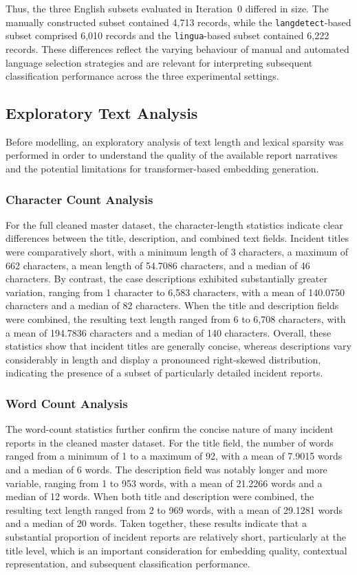 \documentclass[11pt, titlepage, bibliography=totoc]{scrreprt}
\begin{document}
Thus, the three English subsets evaluated in Iteration~0 differed in size. The manually constructed subset contained 4,713 records, while the \texttt{langdetect}-based subset comprised 6,010 records and the \texttt{lingua}-based subset contained 6,222 records. These differences reflect the varying behaviour of manual and automated language selection strategies and are relevant for interpreting subsequent classification performance across the three experimental settings.

\subsection{Exploratory Text Analysis}

Before modelling, an exploratory analysis of text length and lexical sparsity was performed in order to understand the quality of the available report narratives and the potential limitations for transformer-based embedding generation.

\subsubsection{Character Count Analysis}

For the full cleaned master dataset, the character-length statistics indicate clear differences between the title, description, and combined text fields. Incident titles were comparatively short, with a minimum length of 3 characters, a maximum of 662 characters, a mean length of 54.7086 characters, and a median of 46 characters. By contrast, the case descriptions exhibited substantially greater variation, ranging from 1 character to 6,583 characters, with a mean of 140.0750 characters and a median of 82 characters. When the title and description fields were combined, the resulting text length ranged from 6 to 6,708 characters, with a mean of 194.7836 characters and a median of 140 characters. Overall, these statistics show that incident titles are generally concise, whereas descriptions vary considerably in length and display a pronounced right-skewed distribution, indicating the presence of a subset of particularly detailed incident reports.


\subsubsection{Word Count Analysis}

The word-count statistics further confirm the concise nature of many incident reports in the cleaned master dataset. For the title field, the number of words ranged from a minimum of 1 to a maximum of 92, with a mean of 7.9015 words and a median of 6 words. The description field was notably longer and more variable, ranging from 1 to 953 words, with a mean of 21.2266 words and a median of 12 words. When both title and description were combined, the resulting text length ranged from 2 to 969 words, with a mean of 29.1281 words and a median of 20 words. Taken together, these results indicate that a substantial proportion of incident reports are relatively short, particularly at the title level, which is an important consideration for embedding quality, contextual representation, and subsequent classification performance.
\end{document}
